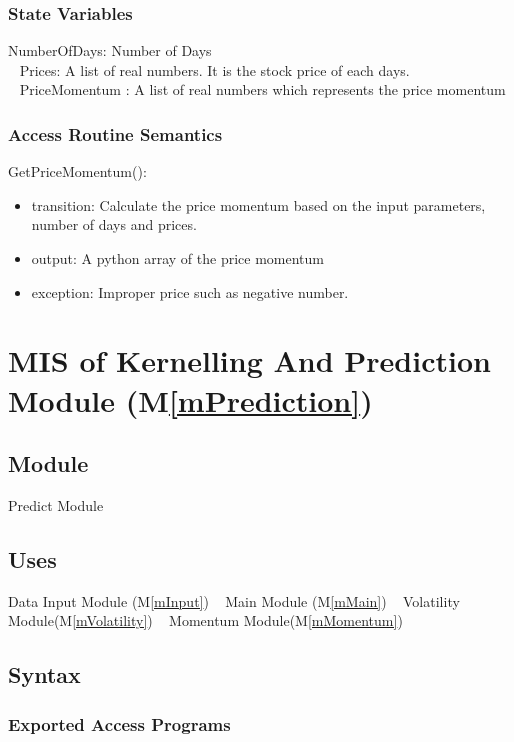 \documentclass[12pt, titlepage]{article}
\newcommand{\mref}[1]{M\ref{#1}}
\begin{document}
\subsubsection{State Variables}
NumberOfDays: Number of Days\\ 
~\newline
Prices: A list of real numbers. It is the stock price of each days.\\
~\newline
PriceMomentum : A list of real numbers which represents the price momentum\\

\subsubsection{Access Routine Semantics}

\noindent GetPriceMomentum():
\begin{itemize}
\item transition: Calculate the price momentum based on the input parameters, number of days and prices.
\item output: A python array of the price momentum
\item exception: Improper price such as negative number.
\end{itemize}

\section{MIS of Kernelling And Prediction Module (\mref{mPrediction}) } 

\subsection{Module}
Predict Module
\subsection{Uses}
Data Input Module (\mref{mInput})
~\newline
Main Module (\mref{mMain})
~\newline
Volatility Module(\mref{mVolatility})
~\newline
Momentum Module(\mref{mMomentum})
\subsection{Syntax}

\subsubsection{Exported Access Programs}
\end{document}
